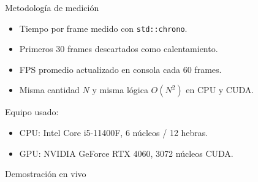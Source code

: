 \documentclass[aspectratio=169]{beamer}
\begin{document}
\begin{frame}{Metodología de medición}
    \begin{itemize}
        \item Tiempo por frame medido con \texttt{std::chrono}.
        \item Primeros 30 frames descartados como calentamiento.
        \item FPS promedio actualizado en consola cada 60 frames.
        \item Misma cantidad $N$ y misma lógica $O(N^2)$ en CPU y CUDA.
    \end{itemize}

    \vspace{0.4cm}

    Equipo usado:

    \begin{itemize}
        \item CPU: Intel Core i5-11400F, 6 núcleos / 12 hebras.
        \item GPU: NVIDIA GeForce RTX 4060, 3072 núcleos CUDA.
    \end{itemize}
\end{frame}

\begin{frame}{Demostración en vivo}
    \begin{center}
        \vspace{0.2cm}

        \vspace{0.25cm}
    \end{center}
\end{frame}
\end{document}
